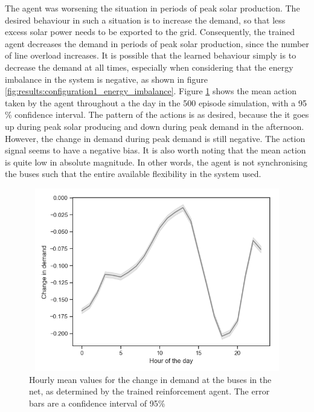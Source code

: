 \documentclass[class=book, crop=false]{standalone}
\begin{document}
The agent was worsening the situation in periods of peak solar production. The desired behaviour in such a situation is to increase the demand, so that less excess solar power needs to be exported to the grid. Consequently, the trained agent decreases the demand in periods of peak solar production, since the number of line overload increases. It is possible that the learned behaviour simply is to decrease the demand at all times, especially when considering that the energy imbalance in the system is negative, as shown in figure \ref{fig:results:configuration1_energy_imbalance}. Figure \ref{fig:discussion:config1_action_hour} shows the mean action taken by the agent throughout a the day in the 500 episode simulation, with a 95 \% confidence interval. The pattern of the actions is as desired, because the it goes up during peak solar producing and down during peak demand in the afternoon. However, the change in demand during peak demand is still negative. The action signal seems to have a negative bias. It is also worth noting that the mean action is quite low in absolute magnitude. In other words, the agent is not synchronising the buses such that the entire available flexibility in the system used.

\begin{figure}[h]
    \center
\includegraphics[height=8cm, width=12cm]{figures/config1_action_hour.png}
    \caption[size = 9]{Hourly mean values for the change in demand at the buses in the net, as determined by the trained reinforcement agent. The error bars are a confidence interval of 95\%}
    \label{fig:discussion:config1_action_hour}
\end{figure}
\end{document}
